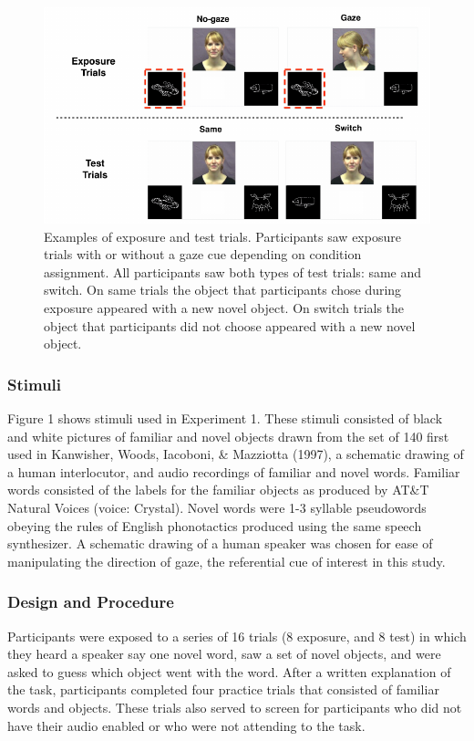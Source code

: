 \documentclass[12pt,]{article}
\begin{document}
\begin{figure}[htbp]
\centering
\includegraphics{figs/stimuli-1.pdf}
\caption{Examples of exposure and test trials. Participants saw exposure
trials with or without a gaze cue depending on condition assignment. All
participants saw both types of test trials: same and switch. On same
trials the object that participants chose during exposure appeared with
a new novel object. On switch trials the object that participants did
not choose appeared with a new novel object.}
\end{figure}

\subsubsection{Stimuli}\label{stimuli}

Figure 1 shows stimuli used in Experiment 1. These stimuli consisted of
black and white pictures of familiar and novel objects drawn from the
set of 140 first used in Kanwisher, Woods, Iacoboni, \& Mazziotta
(1997), a schematic drawing of a human interlocutor, and audio
recordings of familiar and novel words. Familiar words consisted of the
labels for the familiar objects as produced by AT\&T Natural Voices
\texttrademark (voice: Crystal). Novel words were 1-3 syllable
pseudowords obeying the rules of English phonotactics produced using the
same speech synthesizer. A schematic drawing of a human speaker was
chosen for ease of manipulating the direction of gaze, the referential
cue of interest in this study.

\subsubsection{Design and Procedure}\label{design-and-procedure}

Participants were exposed to a series of 16 trials (8 exposure, and 8
test) in which they heard a speaker say one novel word, saw a set of
novel objects, and were asked to guess which object went with the word.
After a written explanation of the task, participants completed four
practice trials that consisted of familiar words and objects. These
trials also served to screen for participants who did not have their
audio enabled or who were not attending to the task.
\end{document}
